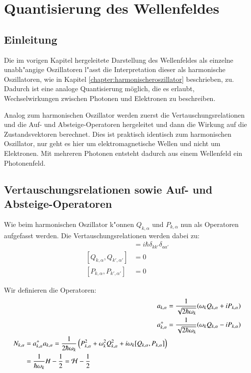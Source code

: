 \section{Quantisierung des Wellenfeldes}

\subsection{Einleitung}
Die im vorigen Kapitel hergeleitete Darstellung des Wellenfeldes als einzelne unabh"angige Oszillatoren l"asst die Interpretation dieser als harmonische Oszillatoren, wie in Kapitel \ref{chapter:harmonischeroszillator} beschrieben, zu. Dadurch ist eine analoge Quantisierung möglich, die es erlaubt, Wechselwirkungen zwischen Photonen und Elektronen zu beschreiben.

Analog zum harmonischen Oszillator werden zuerst die Vertauschungsrelationen und die Auf- und Absteige-Operatoren hergeleitet und dann die Wirkung auf die Zustandsvektoren berechnet. Dies ist praktisch identisch zum harmonischen Oszillator, nur geht es hier um elektromagnetische Wellen und nicht um Elektronen. Mit mehreren Photonen entsteht dadurch aus einem Wellenfeld ein Photonenfeld.

\subsection{Vertauschungsrelationen sowie Auf- und Absteige-Operatoren}
Wie beim harmonischen Oszillator k"onnen $Q_{k,\alpha}$ und $P_{k,\alpha}$ nun als Operatoren aufgefasst werden. Die Vertauschungsrelationen werden dabei zu:
\begin{align*}
[Q_{k,\alpha}, P_{k',\alpha'}] &= i \hbar \delta_{kk'}\delta_{aa'} \\
[Q_{k,\alpha}, Q_{k',\alpha'}] &= 0 \\
[P_{k,\alpha}, P_{k',\alpha'}] &= 0
\end{align*}

Wir definieren die Operatoren:
\begin{align*}
a_{k,\alpha} &= \frac{1}{\sqrt{2 \hbar \omega_k}} (\omega_k Q_{k,\alpha} + iP_{k,\alpha}) \\
a^+_{k,\alpha} &= \frac{1}{\sqrt{2 \hbar \omega_k}} (\omega_k Q_{k,\alpha} - iP_{k,\alpha})\\
\begin{split}
N_{k,\alpha} &= a^+_{k,\alpha} a_{k,\alpha} = \frac{1}{2 \hbar \omega_k} \left(P_{k,\alpha}^2 + \omega_k^2 Q_{k,\alpha}^2 + i\omega_k [Q_{k,\alpha},P_{k,\alpha}] \right) \\
 &= \frac{1}{ \hbar \omega_k } H - \frac{1}{2} = {\cal H} - \frac{1}{2}
\end{split}
\end{align*}

